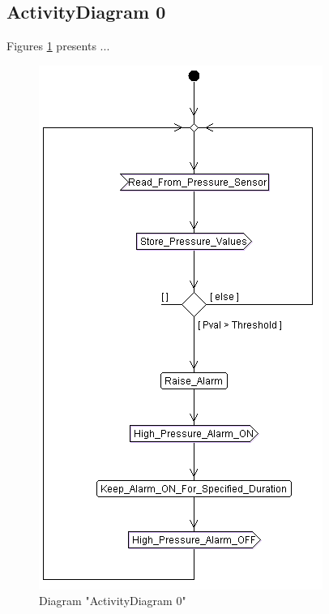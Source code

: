 \subsection{ActivityDiagram 0}
Figures \ref{fig:ActivityDiagram 0ActivityDiagram 011} presents ...
\begin{figure}[htb]
\centering
\includegraphics[width=\textwidth]{img_1_1.png}
\caption{Diagram "ActivityDiagram 0"}
\label{fig:ActivityDiagram 0ActivityDiagram 011}
\end{figure}

